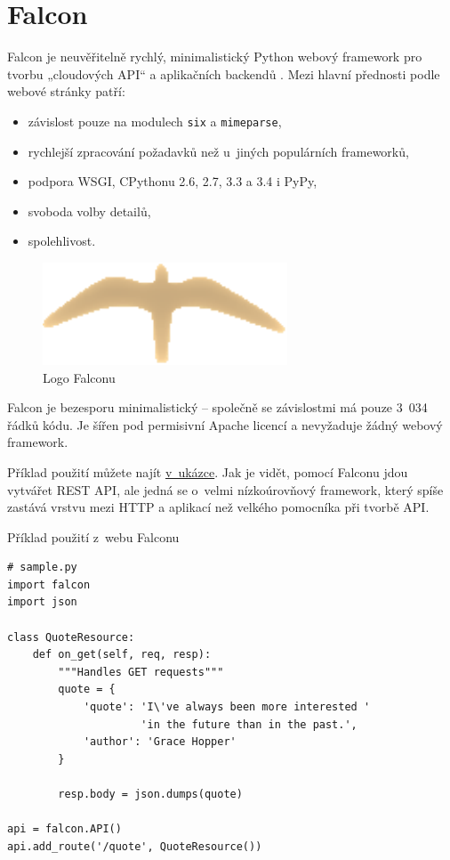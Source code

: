\section{Falcon}\label{falcon}

Falcon je neuvěřitelně rychlý, minimalistický Python webový framework pro tvorbu „cloudových API“ a aplikačních backendů \autocite{falcon}. Mezi hlavní přednosti podle webové stránky \autocite{falcon} patří:

\begin{itemize}
\tightlist
\item
  závislost pouze na modulech \verb!six! a \verb!mimeparse!,
\item
  rychlejší zpracování požadavků než u~jiných populárních frameworků,
\item
  podpora WSGI, CPythonu 2.6, 2.7, 3.3 a 3.4 i PyPy,
\item
  svoboda volby detailů,
\item
  spolehlivost.
\end{itemize}

\begin{figure}
\centering
\includegraphics{images/falcon}
\caption{Logo Falconu \autocite{falconpic}\label{pic:falcon}}
\end{figure}

Falcon je bezesporu minimalistický -- společně se závislostmi má pouze 3~034 řádků kódu. Je šířen pod permisivní Apache licencí \autocite{apache} a nevyžaduje žádný webový framework.

Příklad použití můžete najít \protect\hyperlink{code:falcon}{v~ukázce}. Jak je vidět, pomocí Falconu jdou vytvářet REST API, ale jedná se o~velmi nízkoúrovňový framework, který spíše zastává vrstvu mezi HTTP a aplikací než velkého pomocníka při tvorbě API.

\begin{listing}[htbp]
\caption{{\label{code:falcon}Příklad použití z~webu Falconu \autocite{falcon}}}
\begin{verbatim}
# sample.py
import falcon
import json

class QuoteResource:
    def on_get(self, req, resp):
        """Handles GET requests"""
        quote = {
            'quote': 'I\'ve always been more interested '
                     'in the future than in the past.',
            'author': 'Grace Hopper'
        }

        resp.body = json.dumps(quote)

api = falcon.API()
api.add_route('/quote', QuoteResource())
\end{verbatim}
\end{listing}

